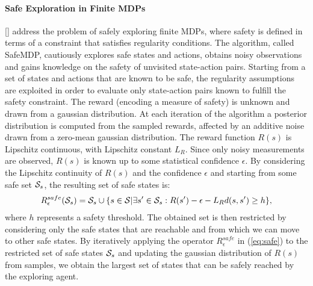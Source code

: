 \paragraph{Safe Exploration in Finite MDPs} \label{subsec:fmdp}
[\cite{turchetta2016}] address the problem of safely exploring finite \ac{MDPs}, where safety is defined in terms of a constraint that satisfies regularity conditions. The algorithm, called SafeMDP, cautiously explores safe states and actions, obtains noisy observations and gains knowledge on the safety of unvisited state-action pairs.
Starting from a set of states and actions that are known to be safe, the regularity assumptions are exploited in order to evaluate only state-action pairs known to fulfill the safety constraint.
The reward (encoding a measure of safety) is unknown and drawn from a gaussian distribution. At each iteration of the algorithm a posterior distribution is computed from the sampled rewards, affected by an additive noise drawn from a zero-mean gaussian distribution. The reward function $R(s)$ is Lipschitz continuous, with Lipschitz constant $L_{R}$. Since only noisy measurements are observed, $R(s)$ is known up to some statistical confidence $\epsilon$. By considering the Lipschitz continuity of $R(s)$ and the confidence $\epsilon$ and starting from some safe set $\mathcal{S}_s$, the resulting set of safe states is:
\begin{align}
R_{\epsilon}^{safe}(\mathcal{S}_s) = \mathcal{S}_s \cup \{s \in \mathcal{S} | \exists s' \in \mathcal{S}_s: R(s') - \epsilon - L_{R} d(s, s') \geq h\}, \label{eq:safe}
\end{align}
where $h$ represents a safety threshold. The obtained set is then restricted by considering only the safe states that are reachable and from which we can move to other safe states.
By iteratively applying the operator $R_{\epsilon}^{safe}$ in (\ref{eq:safe}) to the restricted set of safe states $\mathcal{S}_s$ and updating the gaussian distribution of $R(s)$ from samples, we obtain the largest set of states that can be safely reached by the exploring agent.

